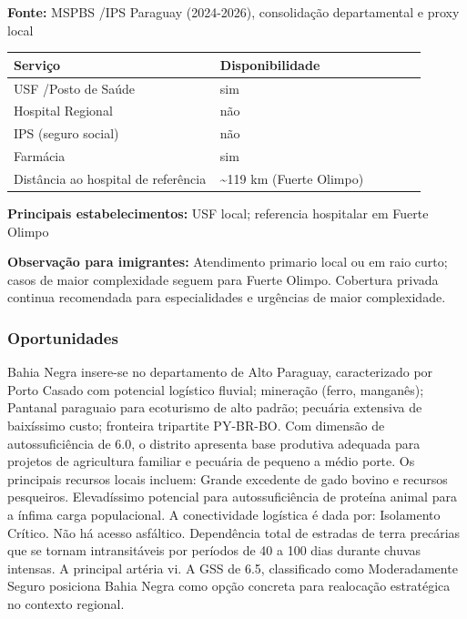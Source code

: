 \textbf{Fonte:} MSPBS /\allowbreak  IPS Paraguay (2024-2026), consolidação
departamental e proxy local

{\def\LTcaptype{none} %
\begin{longtable}{@{}>{\raggedright\arraybackslash}p{0.45\linewidth} >{\raggedright\arraybackslash}p{0.45\linewidth}@{}}
\toprule\noalign{}
Serviço & Disponibilidade \\
\midrule\noalign{}
\endhead
\bottomrule\noalign{}
\endlastfoot
USF /\allowbreak  Posto de Saúde & sim \\
Hospital Regional & não \\
IPS (seguro social) & não \\
Farmácia & sim \\
Distância ao hospital de referência & \textasciitilde119 km (Fuerte
Olimpo) \\
\end{longtable}
}

\textbf{Principais estabelecimentos:} USF local; referencia hospitalar
em Fuerte Olimpo

\textbf{Observação para imigrantes:} Atendimento primario local ou em
raio curto; casos de maior complexidade seguem para Fuerte Olimpo.
Cobertura privada continua recomendada para especialidades e urgências
de maior complexidade.
\newpage

\subsubsection*{Oportunidades}\label{oport-bahia-negra-1704}
Bahia Negra insere-se no departamento de Alto Paraguay, caracterizado por Porto Casado com potencial logístico fluvial; mineração (ferro, manganês); Pantanal paraguaio para ecoturismo de alto padrão; pecuária extensiva de baixíssimo custo; fronteira tripartite PY-BR-BO. Com dimensão de autossuficiência de 6.0, o distrito apresenta base produtiva adequada para projetos de agricultura familiar e pecuária de pequeno a médio porte. Os principais recursos locais incluem: Grande excedente de gado bovino e recursos pesqueiros. Elevadíssimo potencial para autossuficiência de proteína animal para a ínfima carga populacional. A conectividade logística é dada por: Isolamento Crítico. Não há acesso asfáltico. Dependência total de estradas de terra precárias que se tornam intransitáveis por períodos de 40 a 100 dias durante chuvas intensas. A principal artéria vi. A GSS de 6.5, classificado como Moderadamente Seguro posiciona Bahia Negra como opção concreta para realocação estratégica no contexto regional.

